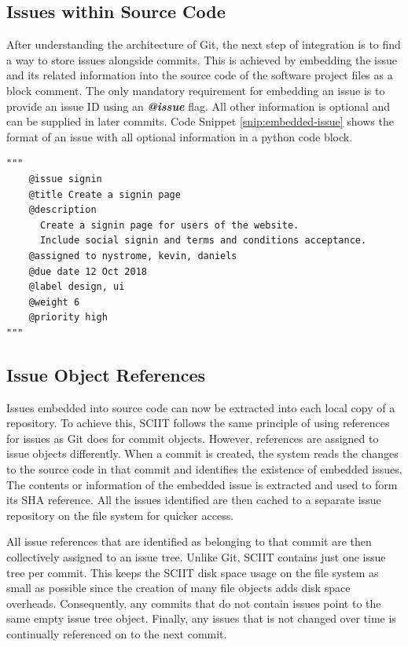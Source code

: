 \documentclass{mproj}
\newenvironment{code}{\captionsetup{type=listing}}{}
\begin{document}
\subsection{Issues within Source Code}

After understanding the architecture of Git, the next step of integration is to find a way to store issues alongside commits. This is achieved by embedding the issue and its related information into the source code of the software project files as a block comment. The only mandatory requirement for embedding an issue is to provide an issue ID using an \textbf{\textit{@issue}} flag. All other information is optional and can be supplied in later commits. Code Snippet \ref{snip:embedded-issue} shows the format of an issue with all optional information in a python code block.

\begin{code}
\label{snip:embedded-issue}
\begin{verbatim}
"""
    @issue signin
    @title Create a signin page
    @description
      Create a signin page for users of the website. 
      Include social signin and terms and conditions acceptance.
    @assigned to nystrome, kevin, daniels
    @due date 12 Oct 2018
    @label design, ui
    @weight 6
    @priority high    
"""
\end{verbatim}
\end{code}


\subsection{Issue Object References}

Issues embedded into source code can now be extracted into each local copy of a repository. To achieve this, SCIIT follows the same principle of using references for issues as Git does for commit objects. However, references are assigned to issue objects differently. When a commit is created, the system reads the changes to the source code in that commit and identifies the existence of embedded issues. The contents or information of the embedded issue is extracted and used to form its SHA reference. All the issues identified are then cached to a separate issue repository on the file system for quicker access.

All issue references that are identified as belonging to that commit are then collectively assigned to an issue tree. Unlike Git, SCIIT contains just one issue tree per commit. This keeps the SCIIT disk space usage on the file system as small as possible since the creation of many file objects adds disk space overheads. Consequently, any commits that do not contain issues point to the same empty issue tree object. Finally, any issues that is not changed over time is continually referenced on to the next commit.
\end{document}
